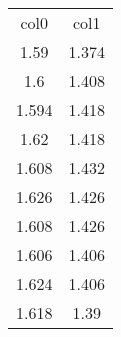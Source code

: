 \begin{table}
\begin{tabular}{cc}
col0 & col1 \\
1.59 & 1.374 \\
1.6 & 1.408 \\
1.594 & 1.418 \\
1.62 & 1.418 \\
1.608 & 1.432 \\
1.626 & 1.426 \\
1.608 & 1.426 \\
1.606 & 1.406 \\
1.624 & 1.406 \\
1.618 & 1.39 \\
\end{tabular}
\end{table}
